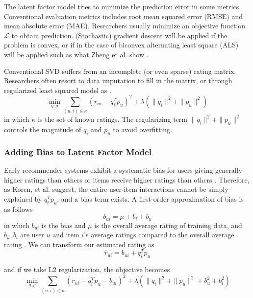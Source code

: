 \documentclass[letter paper, 11pt]{article}
\begin{document}
	The latent factor model tries to minimize the prediction error in some metrics. Conventional evaluation metrics includes root mean squared error (RMSE) and mean absolute error (MAE). Researchers usually minimize an objective function $\mathcal{L}$ to obtain prediction. (Stochastic) gradient descent will be applied if the problem is convex, or if in the case of biconvex alternating least square (ALS) will be applied such as what Zheng et al. show \cite{RSVD}.
	
	
	Conventional SVD suffers from an incomplete (or even sparse) rating matrix. Researchers often resort to data imputation to fill in the matrix, or through regularized least squared model as \cite{MFinRS}.
	\begin{equation}
		\min_{q, p} \sum_{(u, i) \in \kappa} (r_{ui} - q_i^T p_u)^2 + \lambda(\|q_i\|^2 + \|p_u\|^2)
	\end{equation}
	in which $\kappa$ is the set of known ratings. The regularizing term $\|q_i\|^2 + \|p_u\|^2$ controls the magnitude of $q_i$ and $p_u$ to avoid overfitting.
	
	 
	\subsubsection{Adding Bias to Latent Factor Model}
	Early recommender systems exhibit a systematic bias for users giving generally higher ratings than others or items receive higher ratings than others \cite{MFinRS}. Therefore, as Koren, et al. suggest, the entire user-item interactions cannot be simply explained by $q_i^T  p_u$, and a bias term exists. A first-order approximation of bias is as follows \cite{MFinRS}
	\begin{equation}
		b_{ui} = \mu + b_i + b_u
	\end{equation}
	in which $b_{ui}$ is the bias and $\mu$ is the overall average rating of training data, and $b_u, b_i$ are user $u$ and item $i$'s average ratings compared to the overall average rating \cite{MFinRS}. We can transform our estimated rating as 
	\begin{equation}
		\hat{r}_{ui} = b_{ui} + q_i^T  p_u 
	\end{equation}
	
	and if we take L2 regularization, the objective becomes
	\begin{equation}
		\min_{q, p} \sum_{(u, i) \in \kappa} (r_{ui} - q_i^T p_u - b_{ui})^2 + \lambda(\|q_i\|^2 + \|p_u\|^2 + b_u^2 + b_i^2)
	\end{equation}
	
\end{document}
